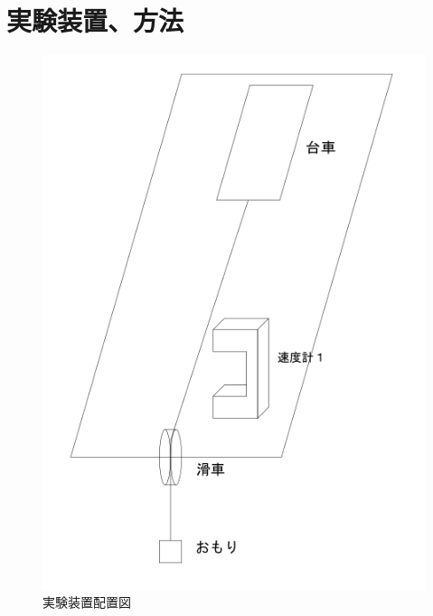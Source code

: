 \documentclass{jlreq}
\begin{document}
\section{実験装置、方法}
\begin{figure}[H]
  \centering
  \includegraphics[scale=0.5]{zikkenzu1.png}
  \caption{実験装置配置図}    
\end{figure}
\end{document}
